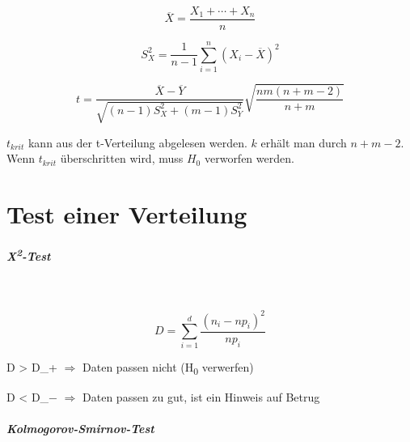 \documentclass[10pt,twoside,landscape]{article}
\begin{document}
\begin{multicols}{2}
\[
\overline{X} = \frac{X_1 + \cdots + X_n}{n}
\]

\[
S_X^2 = \frac{1}{n-1}\sum_{i=1}^n(X_i-\overline{X})^2
\]

\[
t = \frac{\overline{X} - \overline{Y}}{\sqrt{(n-1)S_X^2 + (m-1)S_Y^2}}\sqrt{\frac{nm(n+m-2)}{n+m}}
\]

\(t_{krit}\) kann aus der t-Verteilung abgelesen werden.
\(k\) erhält man durch \(n+m-2\).
Wenn \(t_{krit}\) überschritten wird, muss \(H_0\) verworfen werden.
\section{Test einer Verteilung}
\label{sec:org916f0de}
\subparagraph{X\textsuperscript{2}-Test} \
\label{sec:org6ae923c}

\[
D = \sum_{i=1}^d\frac{(n_i-np_i)^2}{np_i}
\]

D > D\_+ \(\Rightarrow\) Daten passen nicht (H\textsubscript{0} verwerfen)

D < D\_− \(\Rightarrow\) Daten passen zu gut, ist ein Hinweis auf Betrug
\subparagraph{Kolmogorov-Smirnov-Test} \
\label{sec:org7e87dd8}

\end{multicols}
\end{document}
